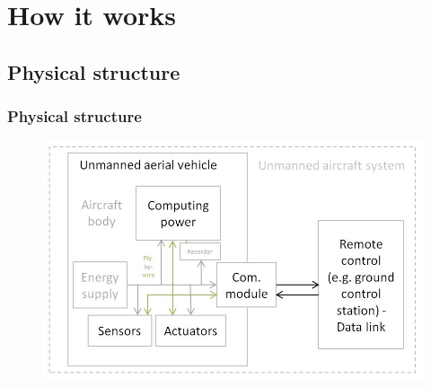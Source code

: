 \section{How it works}

\subsection*{Physical structure}
\begin{frame}
\frametitle{Physical structure}
\begin{figure}[H]
  \begin{center}
  \includegraphics[scale=0.45]{fig/uav_hardware.jpg}
  \end{center}
\end{figure}

\end{frame}



